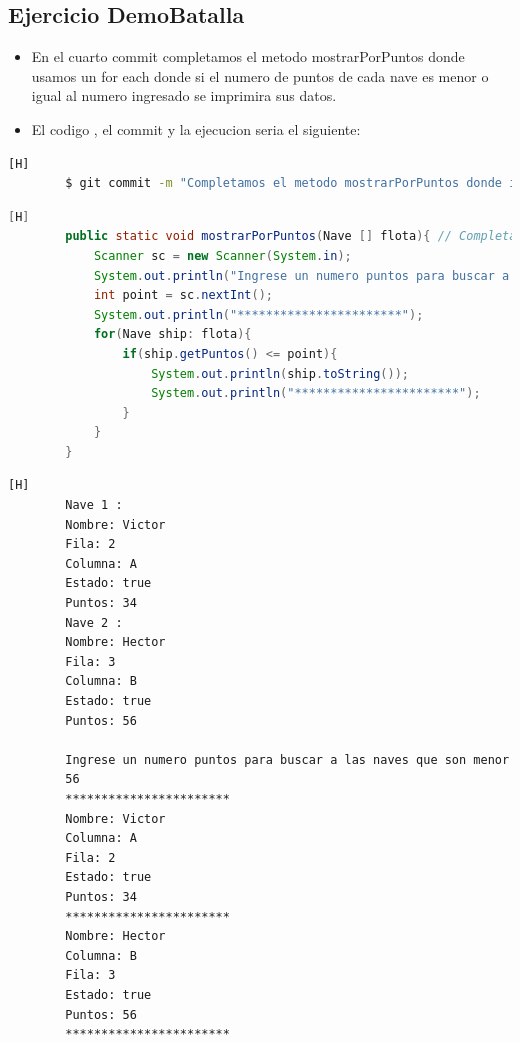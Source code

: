 \documentclass{article}
\begin{document}
	\subsection{Ejercicio DemoBatalla}
	\begin{itemize}	
		\item En el cuarto commit completamos el metodo mostrarPorPuntos donde usamos un for each donde si el numero de puntos de cada nave es menor o igual al numero ingresado se imprimira sus datos.
		\item El codigo , el commit y la ejecucion seria el siguiente:
	\end{itemize}
	\begin{lstlisting}[language=bash,caption={Commit}][H]
		$ git commit -m "Completamos el metodo mostrarPorPuntos donde ingresamos un numero de puntos en esta usamos un for each que pase por todos los elementos donde si su numero de puntos es menor o igual a este numero ingresado se imprimira sus datos"
	\end{lstlisting}
	\begin{lstlisting}[language=java,caption={Las lineas de codigo del metodo completado:}][H]
        public static void mostrarPorPuntos(Nave [] flota){ // Completamos el metodo mostrarPorPuntos donde ingresamos un numero de puntos en esta usamos un for each que pase por todos los elementos donde si su numero de puntos es menor o igual a este numero ingresado se imprimira sus datos
            Scanner sc = new Scanner(System.in);
            System.out.println("Ingrese un numero puntos para buscar a las naves que son menor o igual a esta: ");
            int point = sc.nextInt();
            System.out.println("***********************");
            for(Nave ship: flota){
                if(ship.getPuntos() <= point){
                    System.out.println(ship.toString());
                    System.out.println("***********************");
                }
            }
        }
	\end{lstlisting}
    \begin{lstlisting}[language=bash,caption={La ejecucion dada:}][H]
        Nave 1 : 
        Nombre: Victor
        Fila: 2
        Columna: A
        Estado: true
        Puntos: 34
        Nave 2 : 
        Nombre: Hector
        Fila: 3
        Columna: B
        Estado: true
        Puntos: 56
            
        Ingrese un numero puntos para buscar a las naves que son menor o igual a esta: 
        56
        ***********************
        Nombre: Victor
        Columna: A
        Fila: 2
        Estado: true
        Puntos: 34
        ***********************
        Nombre: Hector
        Columna: B
        Fila: 3
        Estado: true
        Puntos: 56
        ***********************

    \end{lstlisting}
\end{document}
